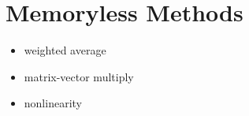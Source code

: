 \section{Memoryless Methods}
\label{sec:memoryless}

\begin{itemize}
  \item weighted average
  \item matrix-vector multiply
  \item nonlinearity
\end{itemize}
